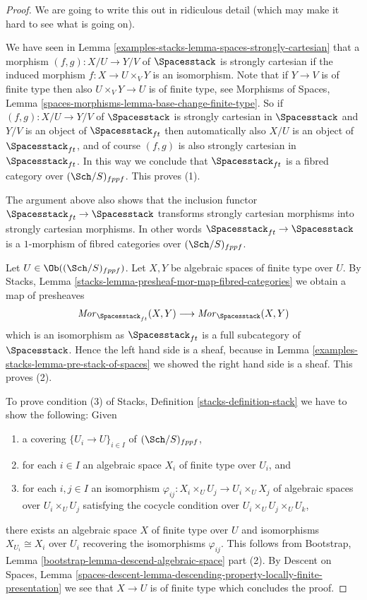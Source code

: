 \begin{proof}
We are going to write this out in ridiculous detail (which may make
it hard to see what is going on).

\medskip\noindent
We have seen in
Lemma \ref{examples-stacks-lemma-spaces-strongly-cartesian}
that a morphism $(f, g) : X/U \to Y/V$ of $\Spacesstack$ is
strongly cartesian if the induced morphism $f : X \to U \times_V Y$
is an isomorphism. Note that if $Y \to V$ is of finite type
then also $U \times_V Y \to U$ is of finite type, see
Morphisms of Spaces,
Lemma \ref{spaces-morphisms-lemma-base-change-finite-type}.
So if $(f, g) : X/U \to Y/V$ of $\Spacesstack$ is
strongly cartesian in $\Spacesstack$ and $Y/V$ is an object
of $\Spacesstack_{ft}$ then automatically also $X/U$ is an
object of $\Spacesstack_{ft}$, and of course $(f, g)$ is
also strongly cartesian in $\Spacesstack_{ft}$. In this way
we conclude that $\Spacesstack_{ft}$ is a fibred category over
$(\Sch/S)_{fppf}$. This proves (1).

\medskip\noindent
The argument above also shows that the inclusion
functor $\Spacesstack_{ft} \to \Spacesstack$ transforms
strongly cartesian morphisms into strongly cartesian morphisms.
In other words $\Spacesstack_{ft} \to \Spacesstack$ is
a $1$-morphism of fibred categories over $(\Sch/S)_{fppf}$.

\medskip\noindent
Let $U \in \Ob((\Sch/S)_{fppf})$.
Let $X, Y$ be algebraic spaces of finite type over $U$. By
Stacks, Lemma \ref{stacks-lemma-presheaf-mor-map-fibred-categories}
we obtain a map of presheaves
$$
\mathit{Mor}_{\Spacesstack_{ft}}(X, Y)
\longrightarrow
\mathit{Mor}_{\Spacesstack}(X, Y)
$$
which is an isomorphism as $\Spacesstack_{ft}$ is a full subcategory of
$\Spacesstack$. Hence the left hand side is a sheaf, because in
Lemma \ref{examples-stacks-lemma-pre-stack-of-spaces}
we showed the right hand side is a sheaf. This proves (2).

\medskip\noindent
To prove condition (3) of
Stacks, Definition \ref{stacks-definition-stack}
we have to show the following: Given
\begin{enumerate}
\item a covering $\{U_i \to U\}_{i \in I}$ of $(\Sch/S)_{fppf}$,
\item for each $i \in I$ an algebraic space $X_i$ of finite type over $U_i$,
and
\item for each $i, j \in I$ an isomorphism
$\varphi_{ij} : X_i \times_U U_j \to U_i \times_U X_j$ of algebraic spaces
over $U_i \times_U U_j$ satisfying the cocycle condition over
$U_i \times_U U_j \times_U U_k$,
\end{enumerate}
there exists an algebraic space $X$ of finite type over $U$ and isomorphisms
$X_{U_i} \cong X_i$ over $U_i$ recovering the isomorphisms $\varphi_{ij}$.
This follows from
Bootstrap, Lemma \ref{bootstrap-lemma-descend-algebraic-space} part (2). By
Descent on Spaces, Lemma
\ref{spaces-descent-lemma-descending-property-locally-finite-presentation}
we see that $X \to U$ is of finite type which concludes the proof.
\end{proof}

